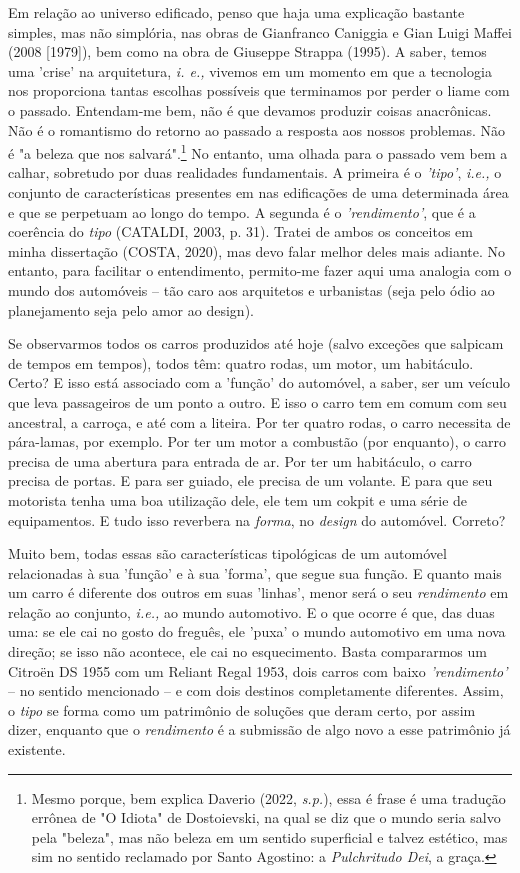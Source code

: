 \documentclass[]{report}
\begin{document}
	Em relação ao universo edificado, penso que haja uma explicação bastante simples, mas não simplória, nas obras de Gianfranco Caniggia e Gian Luigi Maffei (2008 [1979]), bem como na obra de Giuseppe Strappa (1995). A saber, temos uma 'crise' na arquitetura, \textit{i. e.,} vivemos em um momento em que a tecnologia nos proporciona tantas escolhas possíveis que terminamos por perder o liame com o passado. Entendam-me bem, não é que devamos produzir coisas anacrônicas. Não é o romantismo do retorno ao passado a resposta aos nossos problemas. Não é "a beleza que nos salvará".\footnote[3]{Mesmo porque, bem explica Daverio (2022, \textit{s.p.}), essa é frase é uma tradução errônea de "O Idiota" de Dostoievski, na qual se diz que o mundo seria salvo pela "beleza", mas não beleza em um sentido superficial e talvez estético, mas sim no sentido reclamado por Santo Agostino: a \textit{Pulchritudo Dei}, a graça.} No entanto, uma olhada para o passado vem bem a calhar, sobretudo por duas realidades fundamentais. A primeira é o \textit{'tipo'}, \textit{i.e.,} o conjunto de características presentes em nas edificações de uma determinada área e que se perpetuam ao longo do tempo. A segunda é o \textit{'rendimento'}, que é a coerência do \textit{tipo} (CATALDI, 2003, p. 31). Tratei de ambos os conceitos em minha dissertação (COSTA, 2020), mas devo falar melhor deles mais adiante. No entanto, para facilitar o entendimento, permito-me fazer aqui uma analogia com o mundo dos automóveis – tão caro aos arquitetos e urbanistas (seja pelo ódio ao planejamento seja pelo amor ao design). 
	
	Se observarmos todos os carros produzidos até hoje (salvo exceções que salpicam de tempos em tempos), todos têm: quatro rodas, um motor, um habitáculo. Certo? E isso está associado com a 'função' do automóvel, a saber, ser um veículo que leva passageiros de um ponto a outro. E isso o carro tem em comum com seu ancestral, a carroça, e até com a liteira. Por ter quatro rodas, o carro necessita de pára-lamas, por exemplo. Por ter um motor a combustão (por enquanto), o carro precisa de uma abertura para entrada de ar. Por ter um habitáculo, o carro precisa de portas. E para ser guiado, ele precisa de um volante. E para que seu motorista tenha uma boa utilização dele, ele tem um cokpit e uma série de equipamentos. E tudo isso reverbera na \textit{forma}, no \textit{design} do automóvel. Correto? 
	
	Muito bem, todas essas são características tipológicas de um automóvel relacionadas à sua 'função' e à sua 'forma', que segue sua função. E quanto mais um carro é diferente dos outros em suas 'linhas', menor será o seu \textit{rendimento} em relação ao conjunto, \textit{i.e.,} ao mundo automotivo. E o que ocorre é que, das duas uma: se ele cai no gosto do freguês, ele 'puxa' o mundo automotivo em uma nova direção; se isso não acontece, ele cai no esquecimento. Basta compararmos um Citroën DS 1955 com um Reliant Regal 1953, dois carros com baixo \textit{'rendimento'} – no sentido mencionado – e com dois destinos completamente diferentes. Assim, o \textit{tipo} se forma como um patrimônio de soluções que deram certo, por assim dizer, enquanto que o \textit{rendimento} é a submissão de algo novo a esse patrimônio já existente.
	
\end{document}
